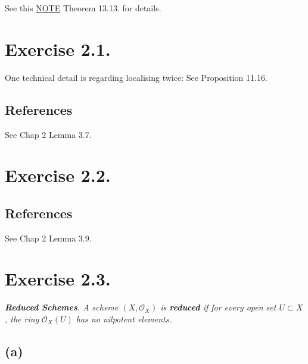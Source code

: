 See this \href{https://math.mit.edu/~mckernan/Teaching/09-10/Autumn/18.725/l_13.pdf}{NOTE} Theorem 13.13. for details.

\section{Exercise 2.1.}\label{Hart Ex 2.1.}

One technical detail is regarding localising twice: See \cite{altman2013term} Proposition 11.16.

\subsection{References}

See \cite{qing2006algebraic} Chap 2 Lemma 3.7. 

\section{Exercise 2.2.}

\subsection{References}

See \cite{qing2006algebraic} Chap 2 Lemma 3.9.

\section{Exercise 2.3.}
\textit{\textbf{Reduced Schemes}. A scheme $(X,\mathcal O_X)$ is \textbf{reduced} if for every open set $U\subset X$, the ring $\mathcal O_X(U)$ has no nilpotent elements.}

\subsection{(a)}

